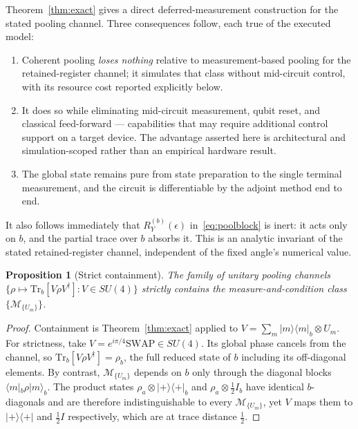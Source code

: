\documentclass[conference]{IEEEtran}
\newtheorem{proposition}{Proposition}
\begin{document}
Theorem~\ref{thm:exact} gives a direct deferred-measurement construction for the stated pooling channel. Three consequences follow, each true of the executed model:
\begin{enumerate}
\item Coherent pooling \emph{loses nothing} relative to measurement-based pooling for the retained-register channel; it simulates that class without mid-circuit control, with its resource cost reported explicitly below.
\item It does so while eliminating mid-circuit measurement, qubit reset, and classical feed-forward --- capabilities that may require additional control support on a target device. The advantage asserted here is architectural and simulation-scoped rather than an empirical hardware result.
\item The global state remains pure from state preparation to the single terminal measurement, and the circuit is differentiable by the adjoint method end to end.
\end{enumerate}

It also follows immediately that $R_Y^{(b)}(\epsilon)$ in~\eqref{eq:poolblock} is inert: it acts only on $b$, and the partial trace over $b$ absorbs it. This is an analytic invariant of the stated retained-register channel, independent of the fixed angle's numerical value.

\begin{proposition}[Strict containment]
\label{prop:containment}
The family of unitary pooling channels $\{\rho \mapsto \mathrm{Tr}_b[V \rho V^{\dagger}] : V \in SU(4)\}$ \emph{strictly} contains the measure-and-condition class $\{\mathcal{M}_{\{U_m\}}\}$.
\end{proposition}

\begin{proof}
Containment is Theorem~\ref{thm:exact} applied to $V = \sum_m |m\rangle\langle m|_b \otimes U_m$. For strictness, take $V = e^{i\pi/4}\mathrm{SWAP} \in SU(4)$. Its global phase cancels from the channel, so $\mathrm{Tr}_b[V \rho V^{\dagger}] = \rho_b$, the full reduced state of $b$ including its off-diagonal elements. By contrast, $\mathcal{M}_{\{U_m\}}$ depends on $b$ only through the diagonal blocks $\langle m|_b \rho |m\rangle_b$. The product states $\rho_a \otimes |{+}\rangle\langle{+}|_b$ and $\rho_a \otimes \tfrac{1}{2}I_b$ have identical $b$-diagonals and are therefore indistinguishable to every $\mathcal{M}_{\{U_m\}}$, yet $V$ maps them to $|{+}\rangle\langle{+}|$ and $\tfrac{1}{2}I$ respectively, which are at trace distance $\tfrac{1}{2}$.
\end{proof}
\end{document}
